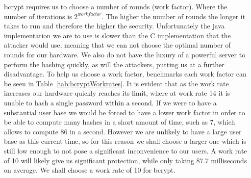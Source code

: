 \documentclass[12pt, titlepage]{article}
\begin{document}
\newline \indent bcrypt requires us to choose a number of rounds (work factor). Where the number of iterations is $2^{workfactor}$. The higher the number of rounds the longer it takes to run and therefore the higher the security. Unfortunately the java implementation we are to use is slower than the C implementation that the attacker would use, meaning that we can not choose the optimal number of rounds for our hardware. We also do not have the luxury of a powerful server to perform the hashing quickly, as will the attackers, putting us at a further disadvantage. To help us choose a work factor, benchmarks each work factor can be seen in Table~\ref{tab:bcryptWorkrates}. It is evident that as the work rate increases our hardware quickly reaches its limit, where at work rate 14 it is unable to hash a single password within a second. If we were to have a substantial user base we would be forced to have a lower work factor in order to be able to compute many hashes in a short amount of time, such as 7, which allows to compute 86 in a second. However we are unlikely to have a large user base as this current time, so for this reason we shall choose a larger one which is still low enough to not pose a significant inconvenience to our users. A work rate of 10 will likely give us significant protection, while only taking 87.7 milliseconds on average. We shall choose a work rate of 10 for bcrypt.
\end{document}
